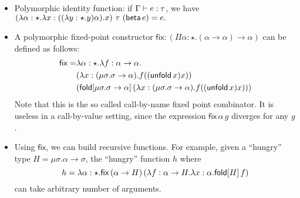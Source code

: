 \begin{itemize}
  \newcommand{\FPTypeU}{\mu\sigma . \sigma \to \alpha}
  \newcommand{\FPTermfxx}{\lambda
    x:(\FPTypeU).f((\unfold{x})x)}
  \newcommand{\FP}{\mathsf{fix}} %
\item Polymorphic identity function: if $\Gamma \vdash e:\tau$, we have
$(\lambda \alpha:\star.\lambda x:((\lambda y:\star.y) \alpha).x)~\tau~(\mathsf{beta}\,e)=e.$
\item A polymorphic fixed-point constructor
  $\FP:(\Pi \alpha:\star.(\alpha \to \alpha) \to \alpha)$ can be
  defined as follows:
\begin{align*}
  \FP=&\lambda \alpha:\star . \lambda f:\alpha \to \alpha.\\
      &(\FPTermfxx)\\
      &(\fold{\FPTypeU}{(\FPTermfxx)})
\end{align*}
Note that this is the so called call-by-name fixed point
combinator. It is useless in a call-by-value setting, since the
expression $\FP\,\alpha\,g$ diverges for any $g$.
\newcommand{\HGType}{\mu\sigma. \alpha \to \sigma}%
\item Using $\FP$, we can build recursive functions. For example,
  given a ``hungry'' type $H=\HGType$, the ``hungry'' function $h$
  where
  \[h=\lambda \alpha:\star.\FP\,(\alpha \to H)\,(\lambda f:\alpha \to
  H.\lambda x:\alpha.\fold{H}{f})\]
  can take arbitrary number of arguments.
\end{itemize}
